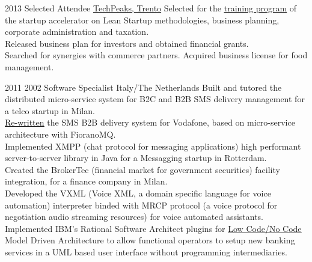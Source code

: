 \documentclass[letterpaper]{twentysecondcv} %
\begin{document}
\begin{twenty}
     \twentyitem
   		{2013}
		{}
        {Selected Attendee}
        {\href{https://www.repubblica.it/rubriche/startup-stories/2013/12/02/news/incubatore_startup-72502909/}{TechPeaks, Trento}}
        {}
        {
Selected for the \href{https://www.repubblica.it/rubriche/startup-stories/2013/12/02/news/incubatore_startup-72502909/}{\underline{training program}} of the startup accelerator on Lean Startup methodologies, business planning, corporate administration and taxation.\\
Released business plan for investors and obtained financial grants.\\
Searched for synergies with commerce partners. Acquired business license for food management.\\
    	}
    	
    	\twentyitem
    	{2011}
    	{2002}
    	{Software Specialist}
    	{Italy/The Netherlands}
    	{}
    	{
    	\textbullet Built and tutored the distributed micro-service system for B2C and B2B SMS delivery management for a telco startup in Milan.\\
    	\textbullet\href{https://gfrison.com/2009/04/24/powered-by-apache-mina/}{\underline{Re-written}} the SMS B2B delivery system for Vodafone, based on micro-service architecture with FioranoMQ.\\
    	\textbullet Implemented XMPP (chat protocol for messaging applications) high performant server-to-server library in Java for a Messagging startup in Rotterdam.\\
    	\textbullet Created the BrokerTec (financial market for government securities) facility integration, for a finance company in Milan.\\
		\textbullet Developed the VXML (Voice XML, a domain specific language for voice automation) interpreter binded with MRCP protocol (a voice protocol for negotiation audio streaming resources) for voice automated assistants.\\
		\textbullet Implemented IBM's Rational Software Architect plugins for \href{https://gfrison.com/tags/\#low-code-no-code}{\underline{Low Code/No Code}} Model Driven Architecture to allow functional operators to setup new banking services in a UML based user interface without programming intermediaries.
       	}

\end{twenty}
\end{document}
